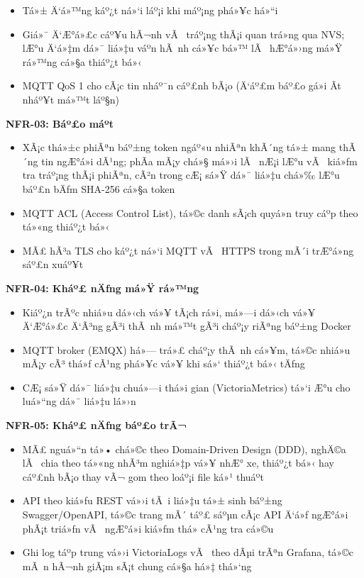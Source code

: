 \documentclass[a4paper]{extarticle}
\providecommand{\tightlist}{%
  \setlength{\itemsep}{0pt}\setlength{\parskip}{0pt}}
\begin{document}
\begin{itemize}
\tightlist
\item
  Tá»± Ä‘á»™ng káº¿t ná»‘i láº¡i khi máº¡ng phá»¥c há»“i
\item
  Giá»¯ Ä‘Æ°á»£c cáº¥u hÃ¬nh vÃ  tráº¡ng thÃ¡i quan trá»ng qua NVS; lÆ°u Ä‘á»‡m dá»¯ liá»‡u
  váº­n hÃ nh cá»¥c bá»™ lÃ  hÆ°á»›ng má»Ÿ rá»™ng cá»§a thiáº¿t bá»‹
\item
  MQTT QoS 1 cho cÃ¡c tin nháº¯n cáº£nh bÃ¡o (Ä‘áº£m báº£o gá»­i Ã­t nháº¥t má»™t láº§n)
\end{itemize}

\textbf{NFR-03: Báº£o máº­t}

\begin{itemize}
\tightlist
\item
  XÃ¡c thá»±c phiÃªn báº±ng token ngáº«u nhiÃªn khÃ´ng tá»± mang thÃ´ng tin ngÆ°á»i
  dÃ¹ng; phÃ­a mÃ¡y chá»§ má»›i lÃ  nÆ¡i lÆ°u vÃ  kiá»ƒm tra tráº¡ng thÃ¡i phiÃªn, cÃ²n
  trong cÆ¡ sá»Ÿ dá»¯ liá»‡u chá»‰ lÆ°u báº£n bÄƒm SHA-256 cá»§a token
\item
  MQTT ACL (Access Control List), tá»©c danh sÃ¡ch quyá»n truy cáº­p theo tá»«ng
  thiáº¿t bá»‹
\item
  MÃ£ hÃ³a TLS cho káº¿t ná»‘i MQTT vÃ  HTTPS trong mÃ´i trÆ°á»ng sáº£n xuáº¥t
\end{itemize}

\textbf{NFR-04: Kháº£ nÄƒng má»Ÿ rá»™ng}

\begin{itemize}
\tightlist
\item
  Kiáº¿n trÃºc nhiá»u dá»‹ch vá»¥ tÃ¡ch rá»i, má»—i dá»‹ch vá»¥ Ä‘Æ°á»£c Ä‘Ã³ng gÃ³i thÃ nh
  má»™t gÃ³i cháº¡y riÃªng báº±ng Docker
\item
  MQTT broker (EMQX) há»— trá»£ cháº¡y thÃ nh cá»¥m, tá»©c nhiá»u mÃ¡y cÃ³ thá»ƒ cÃ¹ng
  phá»¥c vá»¥ khi sá»‘ thiáº¿t bá»‹ tÄƒng
\item
  CÆ¡ sá»Ÿ dá»¯ liá»‡u chuá»—i thá»i gian (VictoriaMetrics) tá»‘i Æ°u cho luá»“ng dá»¯
  liá»‡u lá»›n
\end{itemize}

\textbf{NFR-05: Kháº£ nÄƒng báº£o trÃ¬}

\begin{itemize}
\tightlist
\item
  MÃ£ nguá»“n tá»• chá»©c theo Domain-Driven Design (DDD), nghÄ©a lÃ  chia theo
  tá»«ng nhÃ³m nghiá»‡p vá»¥ nhÆ° xe, thiáº¿t bá»‹ hay cáº£nh bÃ¡o thay vÃ¬ gom theo
  loáº¡i file ká»¹ thuáº­t
\item
  API theo kiá»ƒu REST vá»›i tÃ i liá»‡u tá»± sinh báº±ng Swagger/OpenAPI, tá»©c
  trang mÃ´ táº£ sáºµn cÃ¡c API Ä‘á»ƒ ngÆ°á»i phÃ¡t triá»ƒn vÃ  ngÆ°á»i kiá»ƒm thá»­ cÃ¹ng tra
  cá»©u
\item
  Ghi log táº­p trung vá»›i VictoriaLogs vÃ  theo dÃµi trÃªn Grafana, tá»©c mÃ n
  hÃ¬nh giÃ¡m sÃ¡t chung cá»§a há»‡ thá»‘ng
\end{itemize}
\end{document}
